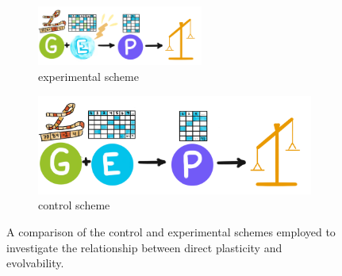 \begin{figure}
  \centering
  \begin{subfigure}[b]{\textwidth}
    \centering
    \includegraphics[width=0.6\textwidth]{img/directscheme}
    \caption{experimental scheme}
    \label{subfig:directscheme}
  \end{subfigure}
  \hfill
  \begin{subfigure}[b]{0.6\textwidth}
    \centering
    \includegraphics[width=\textwidth]{img/modelscheme}
    \caption{control scheme}
     \label{subfig:controlscheme}
  \end{subfigure}
  \captionsetup{singlelinecheck=off,justification=raggedright}
  \caption{A comparison of the control and experimental schemes employed to investigate the relationship between direct plasticity and evolvability.}
  \label{fig:direct_plasticity_scheme}
\end{figure}